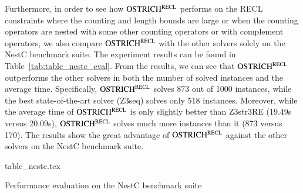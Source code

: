 Furthermore, in order to see how $\rm OSTRICH^{RECL}$ performs on the RECL constraints where the counting and length bounds are large or when the counting operators are nested with some other counting operators or with complement operators, we also compare $\rm OSTRICH^{RECL}$ with the other solvers solely on the NestC benchmark suite. The experiment results can be found in Table~\ref{tab:table_nestc_eval}. From the results, we can see that $\rm OSTRICH^{RECL}$ outperforms the other solvers in both the number of solved instances and the average time. Specifically, $\rm OSTRICH^{RECL}$ solves 873 out of 1000 instances, while the best state-of-the-art solver (Z3seq) solves only 518 instances.  Moreover, while the average time of $\rm OSTRICH^{RECL}$  is only slightly better than Z3str3RE (19.49s versus 20.09s), $\rm OSTRICH^{RECL}$ solves much more instances than it (873 versus 170). The results show the great advantage of $\rm OSTRICH^{RECL}$ against the other solvers on the NestC benchmark suite. 

\begin{table}[htbp]
  \centering\vskip 0pt
    {table_nestc.tex}
    \caption{Performance evaluation on the NestC benchmark suite}
  \label{tab:table_nestc_eval}
\end{table}





